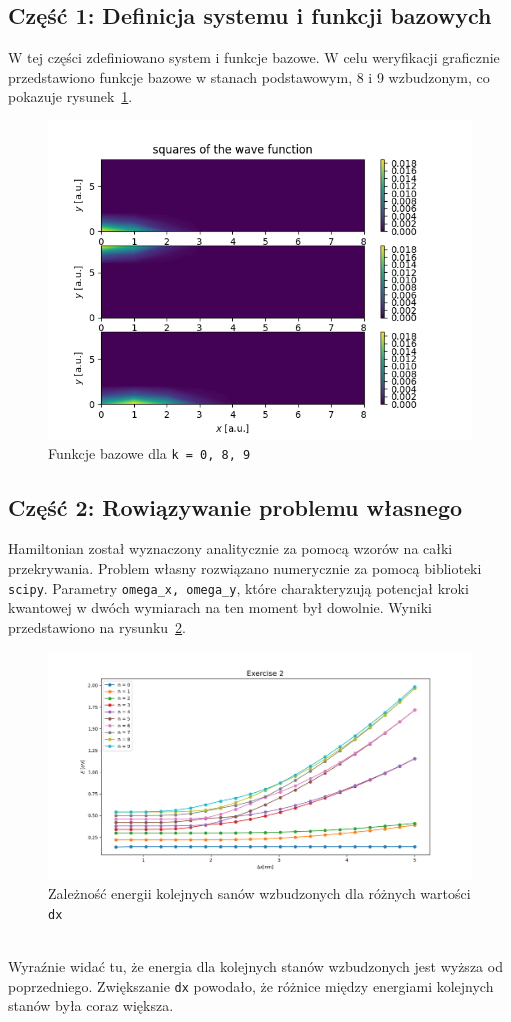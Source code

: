 \documentclass{article}
\begin{document}
\subsection{Część 1: Definicja systemu i funkcji bazowych}
W tej części zdefiniowano system i funkcje bazowe. 
W celu weryfikacji graficznie przedstawiono funkcje bazowe w stanach podstawowym, 8 i 9 wzbudzonym, co pokazuje rysunek~\ref{fig:density ex1}.
\begin{figure}[htp!]
    \centering
    \includegraphics[width=0.75\linewidth]{density_ex1.png}
    \caption{Funkcje bazowe dla \texttt{k = 0, 8, 9}}
    \label{fig:density ex1}
\end{figure}
\subsection{Część 2: Rowiązywanie problemu własnego}
Hamiltonian został wyznaczony analitycznie za pomocą wzorów na całki przekrywania. 
Problem własny rozwiązano numerycznie za pomocą biblioteki \texttt{scipy}. 
Parametry \texttt{omega\_x, omega\_y}, które charakteryzują potencjał kroki kwantowej w dwóch wymiarach na ten moment był dowolnie.
Wyniki przedstawiono na rysunku~\ref{fig:energy of dx ex2}.
\\
\begin{figure}[htp!]
    \centering
    \includegraphics[width=0.75\linewidth]{exercise2.png}
    \caption{Zależność energii kolejnych sanów wzbudzonych dla różnych wartości \texttt{dx}}
    \label{fig:energy of dx ex2}
\end{figure}
\\
Wyraźnie widać tu, że energia dla kolejnych stanów wzbudzonych jest wyższa od poprzedniego.
Zwiększanie \texttt{dx} powodało, że różnice między energiami kolejnych stanów była coraz większa.
\end{document}
